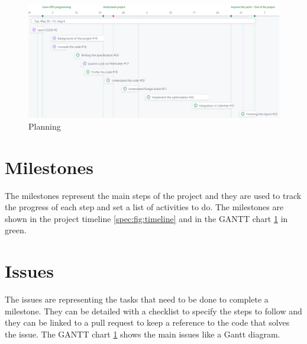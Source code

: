 \begin{figure}[ht]
    \centering
    \includegraphics[width=\textwidth]{05-resources/img/spec/planning-gh.png}
    \caption{Planning}
    \label{spec:fig:planning-gh}
\end{figure}


\section{Milestones}
\label{spec:ch:planning:milestones}

The milestones represent the main steps of the project and they are used to track the progress of each step and set a list of activities to do.
The milestones are shown in the project timeline \ref{spec:fig:timeline} and in the GANTT chart \ref{spec:fig:planning-gh} in green.


\section{Issues}
\label{spec:ch:planning:issues}

The issues are representing the tasks that need to be done to complete a milestone.
They can be detailed with a checklist to specify the steps to follow and they can be linked to a pull request to keep a reference to the code that solves the issue.
The GANTT chart \ref{spec:fig:planning-gh} shows the main issues like a Gantt diagram.

